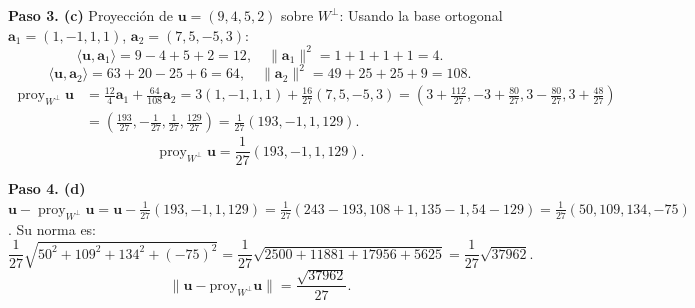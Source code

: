 \begin{prob}
\begin{myproof}
\textbf{Paso 3. (c)} Proyección de \( \mathbf{u}=(9,4,5,2) \) sobre \( W^\perp \):
Usando la base ortogonal \( \mathbf{a}_1 = (1,-1,1,1) \), \( \mathbf{a}_2 = (7,5,-5,3) \):
\[
\langle \mathbf{u}, \mathbf{a}_1 \rangle = 9-4+5+2=12,\quad \|\mathbf{a}_1\|^2 = 1+1+1+1=4.
\]
\[
\langle \mathbf{u}, \mathbf{a}_2 \rangle = 63+20-25+6=64,\quad \|\mathbf{a}_2\|^2 = 49+25+25+9=108.
\]
\[
\begin{aligned}
\operatorname{proy}_{W^\perp} \mathbf{u} &= \frac{12}{4}\mathbf{a}_1 + \frac{64}{108}\mathbf{a}_2
= 3(1,-1,1,1) + \frac{16}{27}(7,5,-5,3)
= \left(3+\frac{112}{27}, -3+\frac{80}{27}, 3-\frac{80}{27}, 3+\frac{48}{27}\right)\\
&= \left(\frac{193}{27}, -\frac{1}{27}, \frac{1}{27}, \frac{129}{27}\right)
= \frac{1}{27}(193,-1,1,129).
\end{aligned}
\]
\[
\boxed{\operatorname{proy}_{W^\perp} \mathbf{u} = \frac{1}{27}(193,-1,1,129)}.
\]

\textbf{Paso 4. (d)} \( \mathbf{u} - \operatorname{proy}_{W^\perp}\mathbf{u} = \mathbf{u} - \frac{1}{27}(193,-1,1,129) = \frac{1}{27}(243-193, 108+1, 135-1, 54-129) = \frac{1}{27}(50,109,134,-75) \).
Su norma es:
\[
\frac{1}{27}\sqrt{50^2+109^2+134^2+(-75)^2} = \frac{1}{27}\sqrt{2500+11881+17956+5625} = \frac{1}{27}\sqrt{37962}.
\]
\[
\boxed{\lVert \mathbf{u}-\text{proy}_{W^{\perp}}\mathbf{u}\rVert = \frac{\sqrt{37962}}{27}}.
\]
\end{myproof}
\end{prob}


